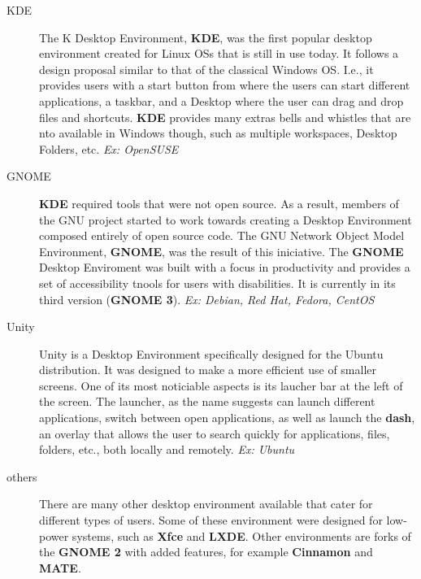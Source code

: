 \begin{description}
\item[KDE]  The K Desktop Environment, \textbf{KDE}, was the first popular desktop environment created for Linux \acs{OS}s that is still in use today. It follows a design proposal similar to that of the classical Windows \acs{OS}. I.e., it provides users with a start button from where the users can start different applications, a taskbar, and a Desktop where the user can drag and drop files and shortcuts. \textbf{KDE} provides many extras bells and whistles that are nto available in Windows though, such as multiple workspaces, Desktop Folders, etc. \textit{Ex: OpenSUSE}
\item[GNOME] \textbf{KDE} required tools that were not open source. As a result, members of the \acs{GNU} project started to work towards creating a Desktop Environment composed entirely of open source code. The \acs{GNU} Network Object Model Environment, \textbf{GNOME}, was the result of this iniciative. The \textbf{GNOME} Desktop Enviroment was built with a focus in productivity and provides a set of accessibility tnools for users with disabilities. It is currently in its third version (\textbf{GNOME 3}). \textit{Ex: Debian, Red Hat, Fedora, CentOS}
\item[Unity] Unity is a Desktop Environment specifically designed for the Ubuntu distribution. It was designed to make a more efficient use of smaller screens. One of its most noticiable aspects is its laucher bar at the left of the screen. The launcher, as the name suggests can launch different applications, switch between open applications, as well as launch the \textbf{dash}, an overlay that allows the user to search quickly for applications, files, folders, etc., both locally and remotely. \textit{Ex: Ubuntu}
\item[others] There are many other desktop environment available that cater for different types of users. Some of these environment were designed for low-power systems, such as \textbf{Xfce} and \textbf{LXDE}. Other environments are forks of the \textbf{GNOME 2} with added features, for example \textbf{Cinnamon} and \textbf{MATE}.
\end{description}

